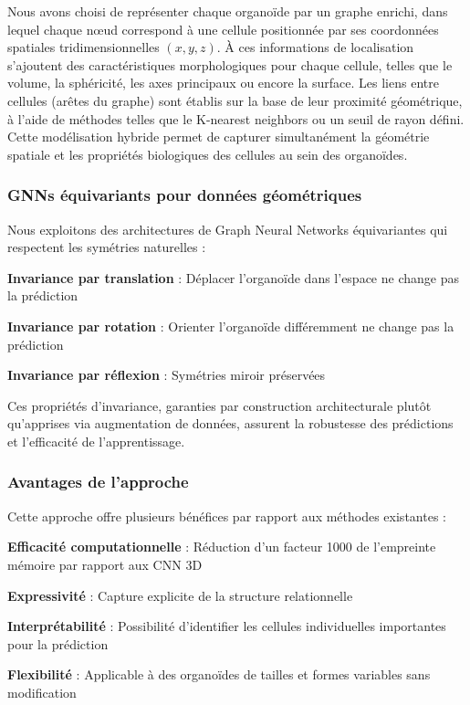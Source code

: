 Nous avons choisi de représenter chaque organoïde par un graphe enrichi, dans lequel chaque nœud correspond à une cellule positionnée par ses coordonnées spatiales tridimensionnelles $(x, y, z)$. À ces informations de localisation s’ajoutent des caractéristiques morphologiques pour chaque cellule, telles que le volume, la sphéricité, les axes principaux ou encore la surface. Les liens entre cellules (arêtes du graphe) sont établis sur la base de leur proximité géométrique, à l’aide de méthodes telles que le K-nearest neighbors ou un seuil de rayon défini. Cette modélisation hybride permet de capturer simultanément la géométrie spatiale et les propriétés biologiques des cellules au sein des organoïdes.

\subsubsection{GNNs équivariants pour données géométriques}

Nous exploitons des architectures de Graph Neural Networks équivariantes qui respectent les symétries naturelles :

\textbf{Invariance par translation} : Déplacer l'organoïde dans l'espace ne change pas la prédiction

\textbf{Invariance par rotation} : Orienter l'organoïde différemment ne change pas la prédiction

\textbf{Invariance par réflexion} : Symétries miroir préservées

Ces propriétés d'invariance, garanties par construction architecturale plutôt qu'apprises via augmentation de données, assurent la robustesse des prédictions et l'efficacité de l'apprentissage.

\subsubsection{Avantages de l'approche}

Cette approche offre plusieurs bénéfices par rapport aux méthodes existantes :

\textbf{Efficacité computationnelle} : Réduction d'un facteur 1000 de l'empreinte mémoire par rapport aux CNN 3D

\textbf{Expressivité} : Capture explicite de la structure relationnelle

\textbf{Interprétabilité} : Possibilité d'identifier les cellules individuelles importantes pour la prédiction

\textbf{Flexibilité} : Applicable à des organoïdes de tailles et formes variables sans modification

